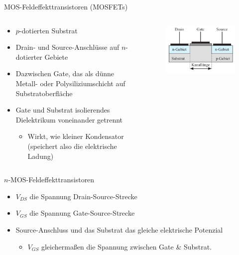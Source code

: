\documentclass[12pt%
,aspectratio=169%
]{beamer}
\begin{document}
\begin{frame}{MOS-Feldeffekttransistoren (MOSFETs)}
\begin{columns}[T] %
\begin{column}{.58\textwidth}
	\begin{itemize}
		\item $p$-dotierten Substrat
		\item Drain- und Source-Anschlüsse auf $n$-dotierter Gebiete
		\item Dazwischen Gate, das als dünne Metall- oder Polysiliziumschicht auf Substratoberﬂäche
		\item Gate und Substrat isolierendes Dielektrikum voneinander getrennt
		\begin{itemize}
			\item Wirkt, wie kleiner Kondensator (speichert also die elektrische Ladung)
		\end{itemize}
	\end{itemize}
\end{column}%
\hfill%
\begin{column}{.38\textwidth}
\begin{figure}
\center
\includegraphics[scale=0.4]{pictures/intern_mosfet}
\end{figure}
\end{column}%
\end{columns}
\end{frame}

\begin{frame}{$n$-MOS-Feldeffekttransistoren}
\begin{itemize}
	\item $V_{DS}$ die Spannung Drain-Source-Strecke
	\item $V_{GS}$ die Spannung Gate-Source-Strecke
	\item Source-Anschluss und das Substrat das gleiche elektrische Potenzial
	\begin{itemize}
		\item $V_{GS}$ gleichermaßen die Spannung zwischen Gate \& Substrat.
	\end{itemize}
\end{itemize}
\end{frame}
\end{document}
